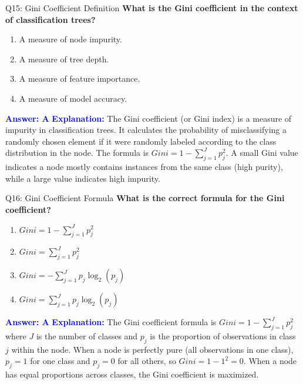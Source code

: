 \documentclass[8pt]{beamer}
\begin{document}
	\begin{frame}{Q15: Gini Coefficient Definition}
		\fontsize{6.5}{7.5}\selectfont
		\textbf{What is the Gini coefficient in the context of classification trees?}
		\begin{enumerate}
			\item A measure of node impurity.
			\item A measure of tree depth.
			\item A measure of feature importance.
			\item A measure of model accuracy.
		\end{enumerate}
		\vspace{0.1cm}
		\textcolor{blue}{\textbf{Answer: A}}
		\vspace{0.1cm}
		\textcolor{blue}{\textbf{Explanation:}} The Gini coefficient (or Gini index) is a measure of impurity in classification trees. It calculates the probability of misclassifying a randomly chosen element if it were randomly labeled according to the class distribution in the node. The formula is $Gini = 1 - \sum_{j=1}^J p_j^2$. A small Gini value indicates a node mostly contains instances from the same class (high purity), while a large value indicates high impurity.
	\end{frame}
	
	\begin{frame}{Q16: Gini Coefficient Formula}
		\fontsize{6.5}{7.5}\selectfont
		\textbf{What is the correct formula for the Gini coefficient?}
		\begin{enumerate}
			\item $Gini = 1 - \sum_{j=1}^J p_j^2$
			\item $Gini = \sum_{j=1}^J p_j^2$
			\item $Gini = -\sum_{j=1}^J p_j \log_2(p_j)$
			\item $Gini = \sum_{j=1}^J p_j \log_2(p_j)$
		\end{enumerate}
		\vspace{0.1cm}
		\textcolor{blue}{\textbf{Answer: A}}
		\vspace{0.1cm}
		\textcolor{blue}{\textbf{Explanation:}} The Gini coefficient formula is $Gini = 1 - \sum_{j=1}^J p_j^2$ where $J$ is the number of classes and $p_j$ is the proportion of observations in class $j$ within the node. When a node is perfectly pure (all observations in one class), $p_j = 1$ for one class and $p_j = 0$ for all others, so $Gini = 1 - 1^2 = 0$. When a node has equal proportions across classes, the Gini coefficient is maximized.
	\end{frame}
	
\end{document}
